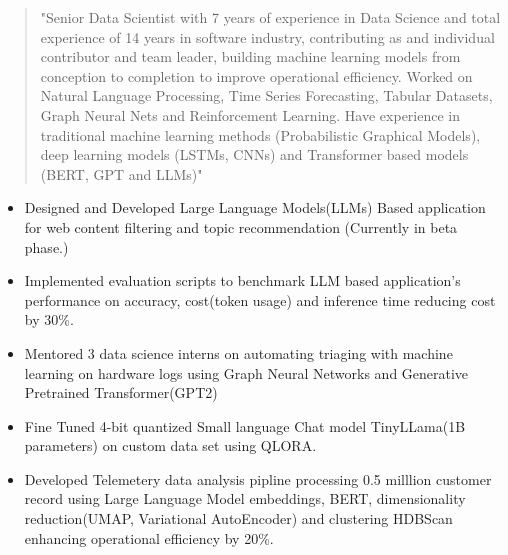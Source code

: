 \documentclass[10pt,a4paper,ragged2e,withhyper]{altacv}
\author{Gaurav Sood}
\date{\today}
\title{}
\begin{document}

\makecvheader

\begin{paracol}{1}
 \begin{quote}
"Senior Data Scientist with 7 years of experience in Data Science and total experience of 14 years in software industry, contributing as and individual contributor and team leader, building machine learning models from conception to completion to improve operational efficiency. Worked on  Natural Language Processing, Time Series Forecasting, Tabular Datasets, Graph Neural Nets and  Reinforcement Learning.  Have experience in traditional machine learning methods (Probabilistic Graphical Models), deep learning models (LSTMs, CNNs) and Transformer based models (BERT, GPT and LLMs)"
 \end{quote}
\label{sec:org5914739}


\divider

\divider


\label{sec:org85a5f5e}

\begin{itemize}
\item Designed and Developed Large Language Models(LLMs) Based application for web content
filtering and topic recommendation (Currently in beta phase.)
\item Implemented evaluation scripts to benchmark LLM based application's performance on
accuracy, cost(token usage) and inference time reducing cost by 30\%.
\item Mentored 3 data science interns on automating triaging with machine learning
on hardware logs using Graph Neural Networks and Generative Pretrained Transformer(GPT2)
\item Fine Tuned 4-bit quantized Small language Chat model TinyLLama(1B parameters) on custom data set using QLORA.
\item Developed Telemetery data analysis pipline processing 0.5 milllion customer record using Large Language Model
embeddings, BERT, dimensionality reduction(UMAP, Variational AutoEncoder) and
clustering HDBScan enhancing operational efficiency by 20\%.
\end{itemize}


\end{paracol}
\end{document}
